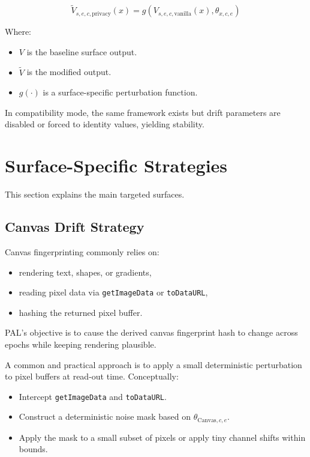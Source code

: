 \documentclass[11pt]{report}
\begin{document}
\[
\widetilde{V}_{s,e,c,\text{privacy}}(x) = g\left(V_{s,e,c,\text{vanilla}}(x), \theta_{x,c,e}\right)
\]

Where:
\begin{itemize}
    \item $V$ is the baseline surface output.
    \item $\widetilde{V}$ is the modified output.
    \item $g(\cdot)$ is a surface-specific perturbation function.
\end{itemize}

In compatibility mode, the same framework exists but drift parameters are disabled or forced to identity values, yielding stability.

\section{Surface-Specific Strategies}

This section explains the main targeted surfaces.

\subsection{Canvas Drift Strategy}

Canvas fingerprinting commonly relies on:
\begin{itemize}
    \item rendering text, shapes, or gradients,
    \item reading pixel data via \texttt{getImageData} or \texttt{toDataURL},
    \item hashing the returned pixel buffer.
\end{itemize}

PAL's objective is to cause the derived canvas fingerprint hash to change across epochs while keeping rendering plausible.

A common and practical approach is to apply a small deterministic perturbation to pixel buffers at read-out time. Conceptually:

\begin{itemize}
    \item Intercept \texttt{getImageData} and \texttt{toDataURL}.
    \item Construct a deterministic noise mask based on $\theta_{\text{Canvas},c,e}$.
    \item Apply the mask to a small subset of pixels or apply tiny channel shifts within bounds.
\end{itemize}
\end{document}
